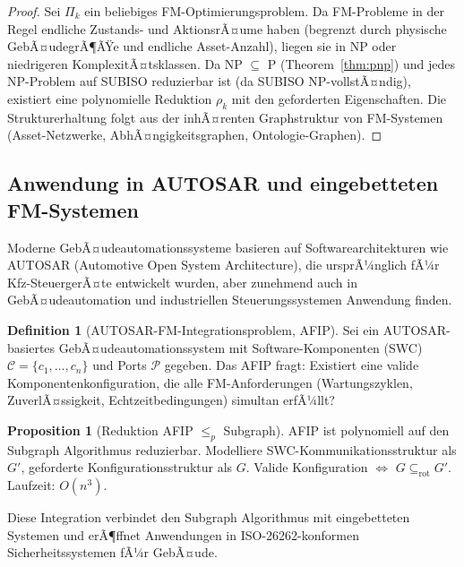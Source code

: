 ﻿\documentclass[a4paper,12pt]{article}
\theoremstyle{definition}
\newtheorem{definition}{Definition}[section]
\newtheorem{proposition}{Proposition}[section]
\begin{document}
\begin{proof}
Sei $\Pi_k$ ein beliebiges FM-Optimierungsproblem.
Da FM-Probleme in der Regel endliche Zustands- und AktionsrÃ¤ume haben
(begrenzt durch physische GebÃ¤udegrÃ¶ÃŸe und endliche Asset-Anzahl),
liegen sie in NP oder niedrigeren KomplexitÃ¤tsklassen.
Da NP $\subseteq$ P (Theorem~\ref{thm:pnp}) und jedes NP-Problem auf SUBISO
reduzierbar ist (da SUBISO NP-vollstÃ¤ndig), existiert eine polynomielle Reduktion
$\rho_k$ mit den geforderten Eigenschaften. Die Strukturerhaltung folgt aus der
inhÃ¤renten Graphstruktur von FM-Systemen (Asset-Netzwerke, AbhÃ¤ngigkeitsgraphen,
Ontologie-Graphen).
\end{proof}

\subsection{Anwendung in AUTOSAR und eingebetteten FM-Systemen}

Moderne GebÃ¤udeautomationssysteme basieren auf Softwarearchitekturen wie
AUTOSAR (Automotive Open System Architecture), die ursprÃ¼nglich fÃ¼r Kfz-SteuergerÃ¤te
entwickelt wurden, aber zunehmend auch in GebÃ¤udeautomation und industriellen
Steuerungssystemen Anwendung finden.

\begin{definition}[AUTOSAR-FM-Integrationsproblem, AFIP]
\label{def:afip}
Sei ein AUTOSAR-basiertes GebÃ¤udeautomationssystem mit Software-Komponenten
(SWC) $\mathcal{C} = \{c_1, \ldots, c_n\}$ und Ports $\mathcal{P}$ gegeben.
Das AFIP fragt: Existiert eine valide Komponentenkonfiguration, die alle
FM-Anforderungen (Wartungszyklen, ZuverlÃ¤ssigkeit, Echtzeitbedingungen)
simultan erfÃ¼llt?
\end{definition}

\begin{proposition}[Reduktion AFIP $\leq_p$ Subgraph]
AFIP ist polynomiell auf den Subgraph Algorithmus reduzierbar.
Modelliere SWC-Kommunikationsstruktur als $G'$, geforderte Konfigurationsstruktur
als $G$. Valide Konfiguration $\Leftrightarrow$ $G \subseteq_{\mathrm{rot}} G'$.
Laufzeit: $O(n^3)$.
\end{proposition}

Diese Integration verbindet den Subgraph Algorithmus mit eingebetteten Systemen
und erÃ¶ffnet Anwendungen in ISO-26262-konformen Sicherheitssystemen fÃ¼r GebÃ¤ude.
\end{document}
